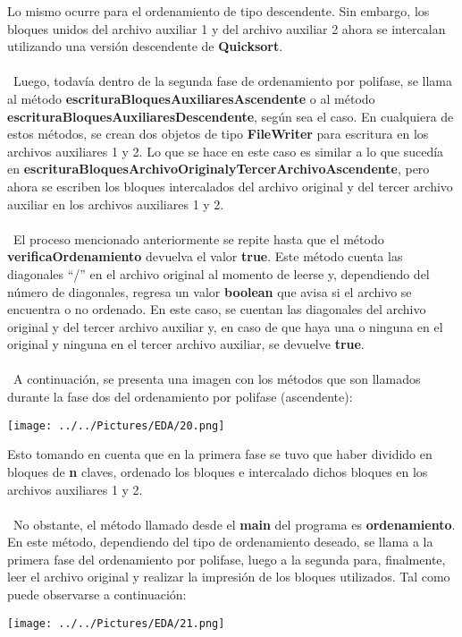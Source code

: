 \documentclass[12pt,letterpaper]{report}
\begin{document}
Lo mismo ocurre para el ordenamiento de tipo descendente. Sin embargo, los bloques unidos del archivo auxiliar 1 y del archivo auxiliar 2 ahora se intercalan utilizando una versión descendente de \textbf{Quicksort}.\\\\\
Luego, todavía dentro de la segunda fase de ordenamiento por polifase, se llama al método \textbf{escrituraBloquesAuxiliaresAscendente} o al método \textbf{escrituraBloquesAuxiliaresDescendente}, según sea el caso. En cualquiera de estos métodos, se crean dos objetos de tipo \textbf{FileWriter} para escritura en los archivos auxiliares 1 y 2. Lo que se hace en este caso es similar a lo que sucedía en \textbf{escrituraBloquesArchivoOriginalyTercerArchivoAscendente}, pero ahora se escriben los bloques intercalados del archivo original y del tercer archivo auxiliar en los archivos auxiliares 1 y 2.\\\\\
El proceso mencionado anteriormente se repite hasta que el método \textbf{verificaOrdenamiento} devuelva el valor \textbf{true}. Este método cuenta las diagonales “/” en el archivo original al momento de leerse y, dependiendo del número de diagonales,  regresa un valor \textbf{boolean} que avisa si el archivo se encuentra o no ordenado. En este caso, se cuentan las diagonales del archivo original y del tercer archivo auxiliar y, en caso de que haya una o ninguna en el original y ninguna en el tercer archivo auxiliar, se devuelve \textbf{true}.\\\\\
A continuación, se presenta una imagen con los métodos que son llamados durante la fase dos del ordenamiento por polifase (ascendente):
\begin{center}
\texttt{[image: ../../Pictures/EDA/20.png]} 
\end{center}
Esto tomando en cuenta que en la primera fase se tuvo que haber dividido en bloques de \textbf{n} claves, ordenado los bloques e intercalado dichos bloques en los archivos auxiliares 1 y 2.\\\\\
No obstante, el método llamado desde el \textbf{main} del programa es \textbf{ordenamiento}. En este método, dependiendo del tipo de ordenamiento deseado, se llama a la primera fase del ordenamiento por polifase, luego a la segunda para, finalmente, leer el archivo original y realizar la impresión de los bloques utilizados. Tal como puede observarse a continuación:
\begin{center}
\texttt{[image: ../../Pictures/EDA/21.png]} 
\end{center}
\end{document}

